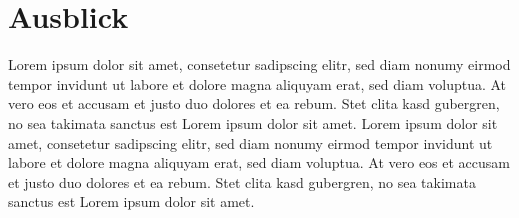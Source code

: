 
\section{Ausblick}

Lorem ipsum dolor sit amet, consetetur sadipscing elitr, sed diam nonumy eirmod tempor invidunt ut labore et dolore magna aliquyam erat, sed diam voluptua. At vero eos et accusam et justo duo dolores et ea rebum. Stet clita kasd gubergren, no sea takimata sanctus est Lorem ipsum dolor sit amet. Lorem ipsum dolor sit amet, consetetur sadipscing elitr, sed diam nonumy eirmod tempor invidunt ut labore et dolore magna aliquyam erat, sed diam voluptua. At vero eos et accusam et justo duo dolores et ea rebum. Stet clita kasd gubergren, no sea takimata sanctus est Lorem ipsum dolor sit amet.

